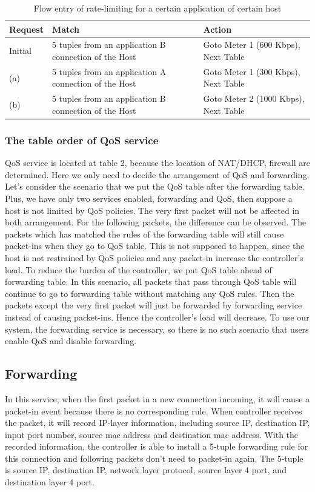 \documentclass[journal]{IEEEtran}
\begin{document}
\begin{table}[]
\centering
\begin{tabular}{|l|l|l|}
\hline
Request  & Match                                                   & Action                                \\ \hline
Initial  & 5 tuples from an application B connection of the Host   & Goto Meter 1 (600 Kbps), Next Table   \\ \hline
(a)      & 5 tuples from an application A connection of the Host   & Goto Meter 1 (300 Kbps), Next Table   \\ \hline
(b)      & 5 tuples from an application B connection of the Host   & Goto Meter 2 (1000 Kbps), Next Table  \\ \hline
\end{tabular}
\caption{Flow entry of rate-limiting for a certain application of certain host}
\label{table:rate_host_app}
\end{table}


\subsubsection{The table order of QoS service}
QoS service is located at table 2, because the location of NAT/DHCP, firewall are determined. Here we only need to decide the arrangement of QoS and forwarding.
Let's consider the scenario that we put the QoS table after the forwarding table. Plus, we have only two services enabled, forwarding and QoS, then suppose a host is not limited by QoS policies. The very first packet will not be affected in both arrangement. For the following packets, the difference can be observed. The packets which has matched the rules of the forwarding table will still cause packet-ins when they go to QoS table. This is not supposed to happen, since the host is not restrained by QoS policies and any packet-in increase the controller's load.
To reduce the burden of the controller, we put QoS table ahead of forwarding table. In this scenario, all packets that pass through QoS table will continue to go to forwarding table without matching any QoS rules. Then the packets except the very first packet will just be forwarded by forwarding service instead of causing packet-ins. Hence the controller's load will decrease. To use our system, the forwarding service is necessary, so there is no such scenario that users enable QoS and disable forwarding.



\subsection{Forwarding}
In this service, when the first packet in a new connection incoming, it will cause a packet-in event because there is no corresponding rule. When controller receives the packet, it will record IP-layer information, including source IP, destination IP, input port number, source mac address and destination mac address. With the recorded information, the controller is able to install a 5-tuple forwarding rule for this connection and following packets don’t need to packet-in again. The 5-tuple is source IP, destination IP, network layer protocol, source layer 4 port, and destination layer 4 port.
\end{document}
